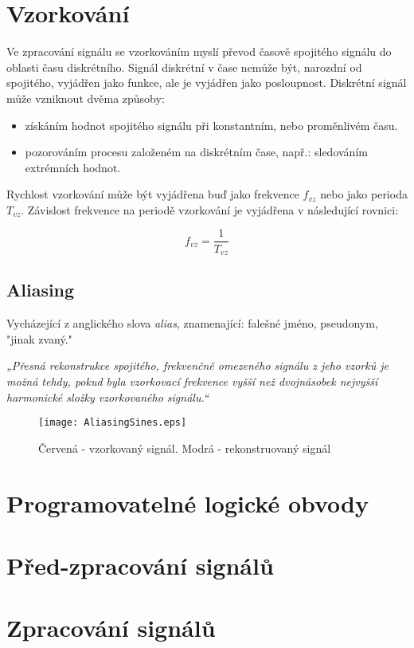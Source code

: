 \documentclass[oneside,12pt,a4paper]{template/SPSTemplate} %
\begin{document}
	
	
	\section{Vzorkování}
	Ve zpracování signálu se vzorkováním myslí převod časově spojitého signálu do oblasti času diskrétního. 
	Signál diskrétní v čase nemůže být, narozdní od spojitého, vyjádřen jako funkce, ale je vyjádřen jako posloupnost.
	Diskrétní signál může vzniknout dvěma způsoby:
	\begin{itemize}
		\item získáním hodnot spojitého signálu při konstantním, nebo proměnlivém času. \cite{discretization_oppenheim}
		\item pozorováním procesu založeném na diskrétním čase, např.: sledováním extrémních hodnot.
	\end{itemize}
	
	
	Rychlost vzorkování může být vyjádřena buď jako frekvence $ f_{vz} $ nebo jako perioda $ T_{vz} $.
	Závislost frekvence na periodě vzorkování je vyjádřena v následující rovnici:
	
	\begin{equation}
	f_{vz} = \frac{1}{T_{vz}}
	\end{equation}

	
	\subsection{Aliasing}
	Vycházející z anglického slova \textit{alias}, znamenající: falešné jméno, pseudonym, "jinak zvaný." 
	

\textit{„Přesná rekonstrukce spojitého, frekvenčně omezeného signálu z jeho vzorků je možná tehdy, pokud byla vzorkovací frekvence vyšší než dvojnásobek nejvyšší harmonické složky vzorkovaného signálu.“}\cite{sampling_nyquist}
	
	\begin{figure}[H]
		\centering
		\texttt{[image: AliasingSines.eps]}
		\caption{Červená - vzorkovaný signál. Modrá - rekonstruovaný signál}
		\label{img:aliasing}
	\end{figure}
	
	\section{Programovatelné logické obvody}

	\section{Před-zpracování signálů}	
	
	\section{Zpracování signálů}
	
	\appendix
	
	\printbibliography
	
	\listoffigures
	\listoftables
	
\end{document}
